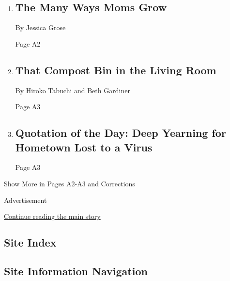 \begin{enumerate}
\def\labelenumi{\arabic{enumi}.}
\item
  \href{/2020/05/09/reader-center/the-many-ways-moms-grow.html}{}

  \hypertarget{the-many-ways-moms-grow}{%
  \subsection{The Many Ways Moms Grow}\label{the-many-ways-moms-grow}}

  By Jessica Grose

  Page A2
\item
  \href{/2020/05/06/climate/nyt-climate-newsletter-composting-coronavirus.html}{}

  \hypertarget{that-compost-bin-in-the-living-room}{%
  \subsection{That Compost Bin in the Living
  Room}\label{that-compost-bin-in-the-living-room}}

  By Hiroko Tabuchi and Beth Gardiner

  Page A3
\item
  \href{/2020/05/09/todayspaper/quotation-of-the-day-deep-yearning-for-hometown-lost-to-a-virus.html}{}

  \hypertarget{quotation-of-the-day-deep-yearning-for-hometown-lost-to-a-virus}{%
  \subsection{Quotation of the Day: Deep Yearning for Hometown Lost to a
  Virus}\label{quotation-of-the-day-deep-yearning-for-hometown-lost-to-a-virus}}

  Page A3
\end{enumerate}

Show More in Pages A2-A3 and Corrections

Advertisement

\protect\hyperlink{after-mid9}{Continue reading the main story}

\hypertarget{site-index}{%
\subsection{Site Index}\label{site-index}}

\hypertarget{site-information-navigation}{%
\subsection{Site Information
Navigation}\label{site-information-navigation}}

